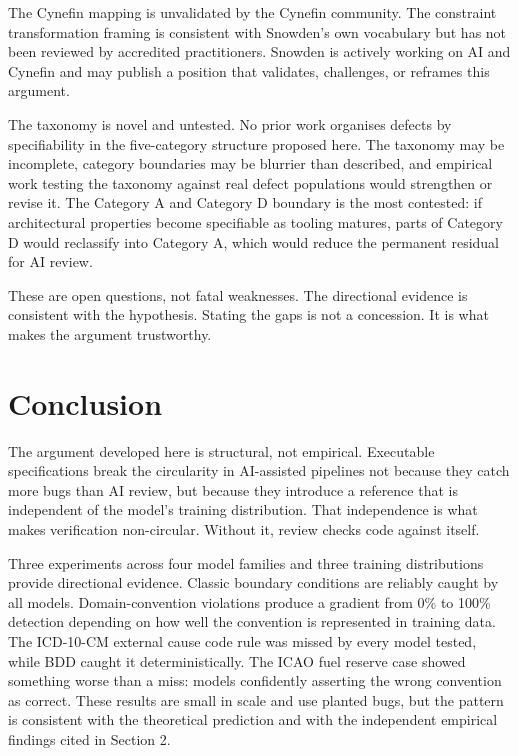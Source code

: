 \documentclass{article}
\begin{document}
The Cynefin mapping is unvalidated by the Cynefin community. The
constraint transformation framing is consistent with Snowden's own
vocabulary but has not been reviewed by accredited practitioners. Snowden
is actively working on AI and Cynefin and may publish a position that
validates, challenges, or reframes this argument.

The taxonomy is novel and untested. No prior work organises defects by
specifiability in the five-category structure proposed here. The taxonomy
may be incomplete, category boundaries may be blurrier than described,
and empirical work testing the taxonomy against real defect populations
would strengthen or revise it. The Category A and Category D boundary is
the most contested: if architectural properties become specifiable as
tooling matures, parts of Category D would reclassify into Category A,
which would reduce the permanent residual for AI review.

These are open questions, not fatal weaknesses. The directional evidence is consistent with the hypothesis. Stating the gaps is not a concession. It is
what makes the argument trustworthy.


\section{Conclusion}

The argument developed here is structural, not empirical. Executable
specifications break the circularity in AI-assisted pipelines not because
they catch more bugs than AI review, but because they introduce a
reference that is independent of the model's training distribution. That
independence is what makes verification non-circular. Without it, review
checks code against itself.

Three experiments across four model families and three training
distributions provide directional evidence. Classic boundary conditions
are reliably caught by all models. Domain-convention violations produce a
gradient from 0\% to 100\% detection depending on how well the convention
is represented in training data. The ICD-10-CM external cause code rule
was missed by every model tested, while BDD caught it deterministically.
The ICAO fuel reserve case showed something worse than a miss: models
confidently asserting the wrong convention as correct. These results are
small in scale and use planted bugs, but the pattern is consistent with
the theoretical prediction and with the independent empirical findings
cited in Section 2.
\end{document}
